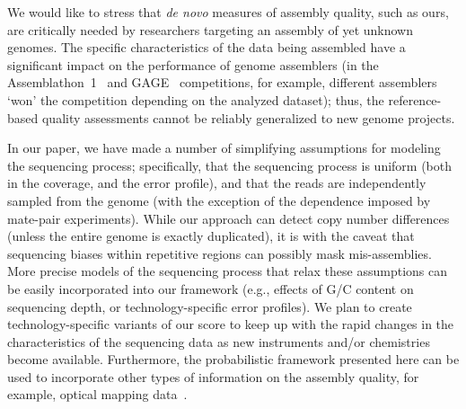 We would like to stress that \emph{de novo} measures of assembly
quality, such as ours, are critically needed by researchers targeting
an assembly of yet unknown genomes.  The specific
characteristics of the data being assembled have a significant impact
on the performance of genome assemblers (in the Assemblathon~1~\cite{earl2011assemblathon} and GAGE~\cite{salzberg2011gage}
competitions, for example, different assemblers `won' the competition
depending on the analyzed dataset); thus, the reference-based quality
assessments cannot be reliably generalized to new genome projects.

In our paper, we have made a number of simplifying assumptions for
modeling the sequencing process; specifically, that the sequencing
process is uniform (both in the coverage, and the error profile), and that the
reads are independently sampled from the genome (with the exception of
the dependence imposed by mate-pair experiments).
While our approach can detect copy number differences (unless the entire genome is exactly duplicated), it is with the caveat that sequencing biases within repetitive regions can possibly mask mis-assemblies.
More precise models
of the sequencing process that relax these assumptions can be easily
incorporated into our framework (e.g., effects of G/C content on
sequencing depth, or technology-specific error profiles). We plan
to create technology-specific variants of our score to keep up with the rapid changes in the characteristics of the sequencing data as new instruments and/or chemistries become available.
Furthermore, the probabilistic framework presented here can be used to
incorporate other types of information on the assembly quality,
for example, optical mapping data~\cite{zhou2007validation}.


